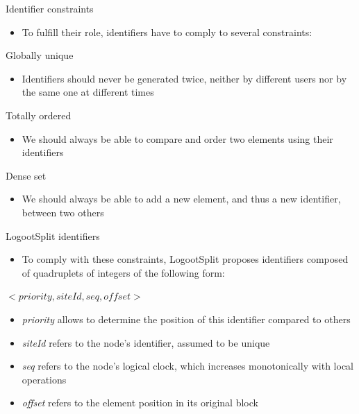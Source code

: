 \documentclass[10pt]{beamer}
\begin{document}
\begin{frame}{Identifier constraints}

  \begin{itemize}
    \item To fulfill their role, identifiers have to comply to several constraints:
  \end{itemize}

  \begin{block}{Globally unique}
    \begin{itemize}
      \item Identifiers should never be generated twice, neither by different users nor by the same one at different times
    \end{itemize}
  \end{block}
  \begin{block}{Totally ordered}
    \begin{itemize}
      \item We should always be able to compare and order two elements using their identifiers
    \end{itemize}
  \end{block}
  \begin{block}{Dense set}
    \begin{itemize}
      \item We should always be able to add a new element, and thus a new identifier, between two others
    \end{itemize}
  \end{block}
\end{frame}

\begin{frame}{LogootSplit identifiers}
  \begin{itemize}
    \item To comply with these constraints, LogootSplit proposes identifiers composed of quadruplets of integers of the following form:
  \end{itemize}
  \begin{center}
    $<priority, siteId, seq, offset>$
  \end{center}
  \begin{itemize}
    \item \emph{priority} allows to determine the position of this identifier compared to others
    \item \emph{siteId} refers to the node's identifier, assumed to be unique
    \item \emph{seq} refers to the node's logical clock, which increases monotonically with local operations
    \item \emph{offset} refers to the element position in its original block
  \end{itemize}
\end{frame}
\end{document}
